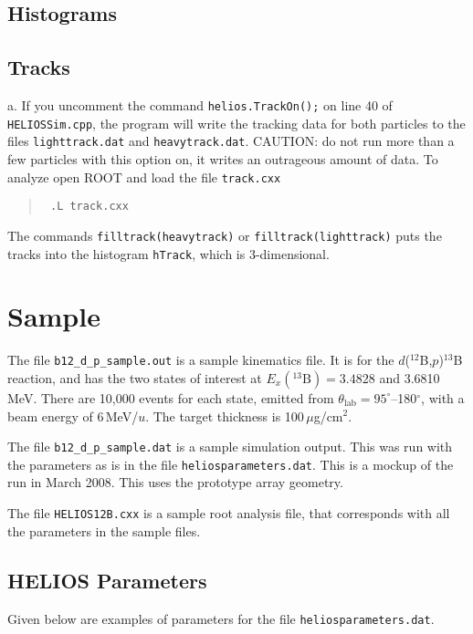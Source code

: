 \subsection{Histograms}

\subsection{Tracks}
a.	If you uncomment the command \texttt{helios.TrackOn();} on line 40 of \texttt{HELIOSSim.cpp}, the program will write the tracking data for both particles to the files \texttt{lighttrack.dat} and \texttt{heavytrack.dat}. CAUTION: do not run more than a few particles with this option on, it writes an outrageous amount of data.
\renewcommand{\FancyVerbFormatLine}[1]{{\color{blue}root [$\emptyset$] }#1}%
To analyze open ROOT and load the file \texttt{track.cxx} 
		\begin{quote}
\begin{Verbatim}
 .L track.cxx
\end{Verbatim}
\end{quote}  
The commands 	 \texttt{filltrack(heavytrack)} or \texttt{filltrack(lighttrack)} puts the tracks into the histogram \texttt{hTrack}, which is 3-dimensional. 

\section{Sample}
The file \texttt{b12\_d\_p\_sample.out} is a sample kinematics file. It is for the $d$($^{12}$B,$p$)$^{13}$B reaction,  and has the two states of interest at $E_x(^{13}\textrm{B})=3.4828$ and 3.6810\,MeV. There are 10,000 events for each state, emitted from $\theta_\mathrm{lab}=95^\circ$--180$^\circ$, with a beam energy of 6\,MeV/$u$. The target thickness is 100\,$\mu$g/cm$^2$. 

The file \texttt{b12\_d\_p\_sample.dat} is a sample simulation output. This was run with the parameters as is in the file \texttt{heliosparameters.dat}. This is a mockup of the run in March 2008. This uses the prototype array geometry.

The file \texttt{HELIOS12B.cxx} is a sample root analysis file, that corresponds with all the parameters in the sample files. \\
\subsection{HELIOS Parameters}
Given below are examples of parameters for the file \texttt{heliosparameters.dat}.
\renewcommand{\thefootnote}{\fnsymbol{footnote}}

